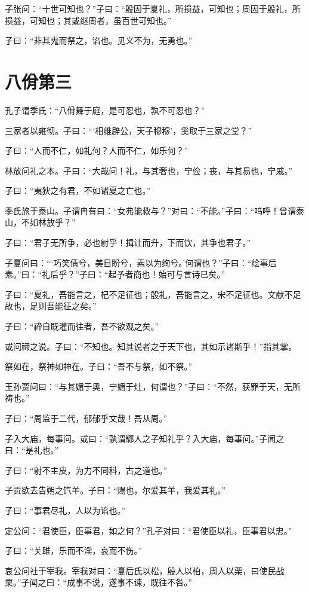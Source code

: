 \documentclass[twoside,openany]{book}
\begin{document}
子张问：“十世可知也？”子曰：“殷因于夏礼，所损益，可知也；周因于殷礼，所损益，可知也；其或继周者，虽百世可知也。”

子曰：“非其鬼而祭之，谄也。见义不为，无勇也。”

\chapter{八佾第三}\label{ch3}

孔子谓季氏：“八佾舞于庭，是可忍也，孰不可忍也？”

三家者以雍彻。子曰：“‘相维辟公，天子穆穆’，奚取于三家之堂？”

子曰：“人而不仁，如礼何？人而不仁，如乐何？”

林放问礼之本。子曰：“大哉问！礼，与其奢也，宁俭；丧，与其易也，宁戚。”

子曰：“夷狄之有君，不如诸夏之亡也。”

季氏旅于泰山。子谓冉有曰：“女弗能救与？”对曰：“不能。”子曰：“呜呼！曾谓泰山，不如林放乎？”

子曰：“君子无所争，必也射乎！揖让而升，下而饮，其争也君子。”

子夏问曰：“‘巧笑倩兮，美目盼兮，素以为绚兮。’何谓也？”子曰：“绘事后素。”曰：“礼后乎？”子曰：“起予者商也！始可与言诗已矣。”

子曰：“夏礼，吾能言之，杞不足征也；殷礼，吾能言之，宋不足征也。文献不足故也，足则吾能征之矣。”

子曰：“禘自既灌而往者，吾不欲观之矣。”

或问禘之说。子曰：“不知也。知其说者之于天下也，其如示诸斯乎！”指其掌。

祭如在，祭神如神在。子曰：“吾不与祭，如不祭。”

王孙贾问曰：“与其媚于奥，宁媚于灶，何谓也？”子曰：“不然，获罪于天，无所祷也。”

子曰：“周监于二代，郁郁乎文哉！吾从周。”

子入大庙，每事问。或曰：“孰谓鄹人之子知礼乎？入大庙，每事问。”子闻之曰：“是礼也。”

子曰：“射不主皮，为力不同科，古之道也。”

子贡欲去告朔之饩羊。子曰：“赐也，尔爱其羊，我爱其礼。”

子曰：“事君尽礼，人以为谄也。”

定公问：“君使臣，臣事君，如之何？”孔子对曰：“君使臣以礼，臣事君以忠。”

子曰：“关雎，乐而不淫，哀而不伤。”

哀公问社于宰我。宰我对曰：“夏后氏以松，殷人以柏，周人以栗，曰使民战栗。”子闻之曰：“成事不说，遂事不谏，既往不咎。”
\end{document}
